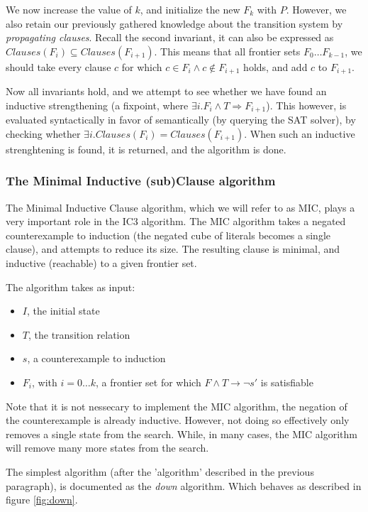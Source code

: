 \documentclass[a4paper]{article}
\begin{document}
We now increase the value of $k$, and initialize the new $F_k$ with $P$.
However, we also retain our previously gathered knowledge about the transition system by \emph{propagating clauses}. Recall the second invariant, it can also be expressed as $Clauses(F_i) \subseteq Clauses(F_{i+1})$. This means that all frontier sets $F_0 \ldots F_{k-1}$, we should take every clause $c$ for which $c \in F_i \land c\notin F_{i+1}$ holds, and add $c$ to $F_{i+1}$.

Now all invariants hold, and we attempt to see whether we have found an inductive strengthening (a fixpoint, where $\exists i. F_i \land T \Rightarrow F_{i+1}$). This however, is evaluated syntactically in favor of semantically (by querying the SAT solver), by checking whether $\exists i. Clauses(F_i) = Clauses(F_{i+1})$. When such an inductive strenghtening is found, it is returned, and the algorithm is done.

\newpage
\subsubsection{The Minimal Inductive (sub)Clause algorithm}
\label{sec:MIC}
The Minimal Inductive Clause algorithm, which we will refer to as MIC, plays a very important role in the IC3 algorithm. The MIC algorithm takes a negated counterexample to induction (the negated cube of literals becomes a single clause), and attempts to reduce its size. The resulting clause is minimal, and inductive (reachable) to a given frontier set.

The algorithm takes as input:
\begin{itemize}
\item $I$, the initial state
\item $T$, the transition relation
\item $s$, a counterexample to induction
\item $F_i$, with $i=0 \ldots k$, a frontier set for which $F \land T \rightarrow \lnot s'$ is satisfiable
\end{itemize}

Note that it is not nessecary to implement the MIC algorithm, the negation of the counterexample is already inductive. However, not doing so effectively only removes a single state from the search. While, in many cases, the MIC algorithm will remove many more states from the search.

The simplest algorithm (after the 'algorithm' described in the previous paragraph), is documented as the \emph{down} algorithm. Which behaves as described in figure \ref{fig:down}.
\end{document}
